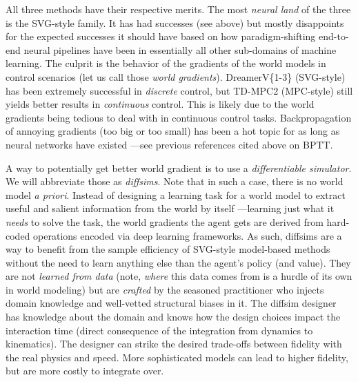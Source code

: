 \documentclass[12pt,a4paper]{article}
\begin{document}
All three methods have their respective merits.
The most \textit{neural land} of the three is the SVG-style family.
It has had successes (see above) but mostly disappoints for the expected successes
it should have based on how paradigm-shifting end-to-end neural pipelines have been in essentially
all other sub-domains of machine learning.
The culprit is the behavior of the gradients of the world models in control scenarios
(let us call those \textit{world gradients}).
DreamerV\{1-3\} (SVG-style) has been extremely successful in \emph{discrete} control,
but TD-MPC2 (MPC-style) still yields better results in \emph{continuous} control.
This is likely due to the world gradients being tedious to deal with in continuous control tasks.
Backpropagation of annoying gradients (too big or too small) has been a hot topic for as long
as neural networks have existed ---see previous references cited above on BPTT.

A way to potentially get better world gradient is to use a \emph{differentiable simulator}.
We will abbreviate those as \textit{diffsims}.
Note that in such a case, there is no world model \textit{a priori}.
Instead of designing a learning task for a world model to extract useful and salient information
from the world by itself ---learning just what it \emph{needs} to solve the task,
the world gradients the agent gets are derived from hard-coded operations encoded via
deep learning frameworks.
As such, diffsims are a way to benefit from the sample efficiency of SVG-style model-based methods
without the need to learn anything else than the agent's policy (and value).
They are not \textit{learned from data} (note, \textit{where} this data comes from is a hurdle
of its own in world modeling) but are \textit{crafted} by the seasoned practitioner
who injects domain knowledge and well-vetted structural biases in it.
The diffsim designer has knowledge about the domain and knows how the design choices impact
the interaction time (direct consequence of the integration from dynamics to kinematics).
The designer can strike the desired trade-offs between fidelity with the real physics and speed.
More sophisticated models can lead to higher fidelity, but are more costly to integrate over.
\end{document}
